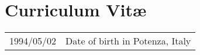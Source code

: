 \chapter*{Curriculum Vit\ae}

\makeatletter
\authors{\@firstname\ {\titleshape\@lastname}}
\makeatother

\noindent
\begin{longtable}{p{} p{}}
    1994/05/02 & Date of birth in Potenza, Italy
\end{longtable}
